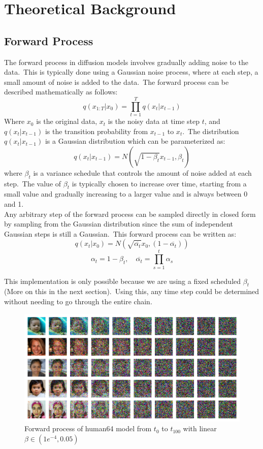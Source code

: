 \documentclass[12pt]{article}
\begin{document}
\section{Theoretical Background}
\subsection{Forward Process}
The forward process in diffusion models involves gradually adding noise to the data.\
This is typically done using a Gaussian noise process, where at each step, a small amount of noise is added to the data.\
The forward process can be described mathematically as follows:
\[q({x_{1:T}}|{x_0}) = \prod\limits_{t = 1}^T {q({x_t}|{x_{t - 1}})} \]
Where \({x_0}\) is the original data, \({x_t}\) is the noisy data at time step \(t\), and \(q({x_t}|{x_{t - 1}})\) is the transition probability from \({x_{t - 1}}\) to \({x_t}\).\
The distribution \(q({x_t}|{x_{t - 1}})\) is a Gaussian distribution which can be parameterized as:
\[q({x_t}|{x_{t - 1}}) = N(\sqrt {1 - {\beta _t}} {x_{t - 1}},{\beta _t})\]
where \({\beta _t}\) is a variance schedule that controls the amount of noise added at each step.\
The value of \({\beta _t}\) is typically chosen to increase over time, starting from a small value and gradually increasing to a larger value and is always between 0 and 1.\\

Any arbitrary step of the forward process can be sampled directly in closed form by sampling from the Gaussian distribution since the sum of independent Gaussian steps is still a Gaussian.\
This forward process can be written as:
\[q({x_t}|{x_0}) = N(\sqrt {\overline {{\alpha _t}} } {x_0},(1 - \overline {{\alpha _t}} ))\]
\[{\alpha _t} = 1 - \beta_t, \hspace{1em} \overline {{\alpha _t}}  = \prod\limits_{s = 1}^t {{\alpha _s}} \]

This implementation is only possible because we are using a fixed scheduled $\beta_t$ (More on this in the next section).\
Using this, any time step could be determined without needing to go through the entire chain.\

\begin{figure}[H]
  \centering
  \includegraphics[width=1\textwidth]{forward2.png}
  \caption{Forward process of human64 model from $t_0$ to $t_{100}$ with linear $\beta \in(1e^{-4}, 0.05)$}
\end{figure}
\end{document}
